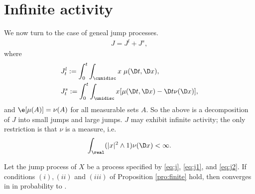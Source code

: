 \section{Infinite activity}
We now turn to the case of geneal \levy jump processes.  
\begin{align}
J = J^l + J^s, 
  \label{eq:j}
\end{align}
where
\begin{align}
  & J^l_t := \int^t_0 \int_\cunidisc x \;  \mu(\D t, \D x),\label{eq:j1}\\ 
  & J^s_t := \int^t_0 \int_\unidisc x  [\mu(\D t, \D x) - \D t\nu(\D x)],  
  \label{eq:j2}
\end{align}
and $\e[\mu(A)] = \nu(A)$ for all measurable sets $A$. So the above is a decomposition of $J$ into small jumps and large jumps. $J$  may exhibit infinite activity; the only restriction is that $\nu$ is a \levy measure, i.e. 
\begin{align}
  \int_\real (\vert x \vert^2 \wedge 1) \nu(\D x) < \infty.\notag
  \label{}
\end{align}
\linebreak
\begin{prop}
  Let the jump process of $X$ be a  \levy process specified by \eqref{eq:j}, \eqref{eq:j1}, and \eqref{eq:j2}. 
  If conditions $(i), (ii)$ and $(iii)$ of Proposition \eqref{pro:finite} hold, then 
  \jvn converges in \Ltwo in probability to \sv.
\end{prop}
